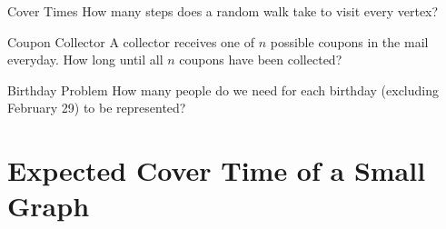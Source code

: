 \documentclass[12pt]{beamer}
\begin{document}
\begin{frame}{Cover Times}
\centering
How many steps does a random walk take to visit every vertex?
\end{frame}

\begin{frame}{Coupon Collector}
\centering
A collector receives one of $n$ possible coupons in the mail everyday.
How long until all $n$ coupons have been collected?
\end{frame}

\begin{frame}{Birthday Problem}
\centering
How many people do we need for each birthday (excluding February 29)
to be represented?
\end{frame}

\section{Expected Cover Time of a Small Graph}
\end{document}

